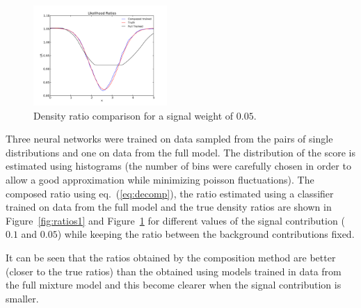 \documentclass[a4paper]{jpconf}
\begin{document}
\begin{figure}[h]
\begin{minipage}{12pc}
\includegraphics[width=12pc]{all_train_mlp_ratio_05.pdf}
\caption{\label{fig:ratios2} Density ratio comparison for a signal weight of $0.05$.}
\end{minipage}
\end{figure}

Three neural networks were trained on data sampled from the pairs of single distributions and one on data from the full model. The distribution of the score is estimated using histograms (the number of bins were carefully chosen in order to allow a good approximation while minimizing poisson fluctuations). The composed ratio using 
eq.~(\ref{eq:decomp}), the ratio estimated using a classifier trained on data from the full model and the true density ratios are shown in Figure~\ref{fig:ratios1} and Figure~\ref{fig:ratios2} for different values of the signal contribution ($0.1$ and $0.05$) while keeping the ratio between the background contributions fixed. 

It can be seen that the ratios obtained by the composition method are better (closer to the true ratios) than the obtained using models trained in data from the full mixture model and this become clearer when the signal contribution is smaller.
\end{document}
